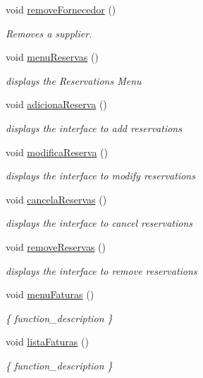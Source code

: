 \begin{DoxyCompactItemize}
void \hyperlink{classEmpresa_a9aa7b7e699971eb2e28f0db99c6500c4}{remove\+Fornecedor} ()
\begin{DoxyCompactList}\small\item\em Removes a supplier. \end{DoxyCompactList}\item 
void \hyperlink{classEmpresa_a0d362cb7362b859ccf99b9603de6b603}{menu\+Reservas} ()
\begin{DoxyCompactList}\small\item\em displays the Reservations Menu \end{DoxyCompactList}\item 
void \hyperlink{classEmpresa_a42953bdbb2fb39173ad6f38892fc122b}{adiciona\+Reserva} ()
\begin{DoxyCompactList}\small\item\em displays the interface to add reservations \end{DoxyCompactList}\item 
void \hyperlink{classEmpresa_ae74f80c120a14f0591d04fe7603e6905}{modifica\+Reserva} ()
\begin{DoxyCompactList}\small\item\em displays the interface to modify reservations \end{DoxyCompactList}\item 
void \hyperlink{classEmpresa_aa0b169a112c75b6fd1bc80128720282e}{cancela\+Reservas} ()
\begin{DoxyCompactList}\small\item\em displays the interface to cancel reservations \end{DoxyCompactList}\item 
void \hyperlink{classEmpresa_a3e0ee0b5d92f0cd655a26095229849f1}{remove\+Reservas} ()
\begin{DoxyCompactList}\small\item\em displays the interface to remove reservations \end{DoxyCompactList}\item 
void \hyperlink{classEmpresa_a58d040d3983d55414d5c6fac5ac3b6c5}{menu\+Faturas} ()
\begin{DoxyCompactList}\small\item\em \{ function\+\_\+description \} \end{DoxyCompactList}\item 
void \hyperlink{classEmpresa_ab1950b5b5e9fca80823b5d01c6c1de6f}{lista\+Faturas} ()
\begin{DoxyCompactList}\small\item\em \{ function\+\_\+description \} \end{DoxyCompactList}\item 

\end{DoxyCompactItemize}
